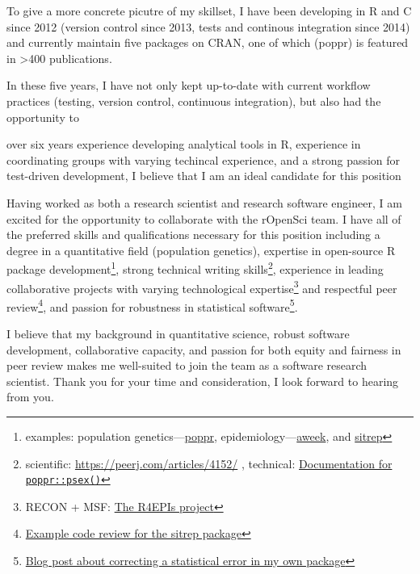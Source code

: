 To give a more concrete picutre of my skillset, I have been developing in R and
C since 2012 (version control since 2013, tests and continous integration since 
2014) and currently maintain five packages on CRAN, one of which (poppr)
is featured in \textgreater400 publications.  

In these five
years, I have not only kept up-to-date with current workflow practices (testing,
version control, continuous integration), but also had the opportunity to 

 over six years experience developing analytical tools in R, experience in coordinating groups with varying
techincal experience, and a strong passion for test-driven development, I
believe that I am an ideal candidate for this position

Having worked as both a research scientist and research software engineer, I am
excited for the opportunity to collaborate with the rOpenSci team. I have all
of the preferred skills and qualifications necessary for this position
including a degree in a quantitative field (population genetics), expertise in
open-source R package development\footnote{examples: population genetics---\href{https://grunwaldlab.github.io/poppr}{poppr}, epidemiology---\href{https://www.repidemicsconsortium.org/aweek}{aweek}, and
\href{https://github.com/R4EPI/sitrep}{sitrep}}, strong technical writing
skills\footnote{scientific: \url{https://peerj.com/articles/4152/} , technical:
\href{https://grunwaldlab.github.io/poppr/reference/psex.html}{Documentation
for \texttt{poppr::psex()}}}, experience in leading collaborative
projects with varying technological expertise\footnote{RECON + MSF: \href{https://R4EPIs.netlify.com}{The R4EPIs
project}} and respectful peer
review\footnote{\href{https://github.com/R4EPI/sitrep/pull/76}{Example code
review for the sitrep package}}, and passion for robustness in statistical
software\footnote{\href{https://zkamvar.netlify.com/post/2017-09-23-squish/squish}{Blog
post about correcting a statistical error in my own package}}.

I believe that my background in quantitative science, robust software
development, collaborative capacity, and passion for both equity and 
fairness in peer review makes me well-suited to join the team as a software
research scientist. Thank you for your time and consideration,
I look forward to hearing from you. 

\makeletterclosing %

\clearpage



